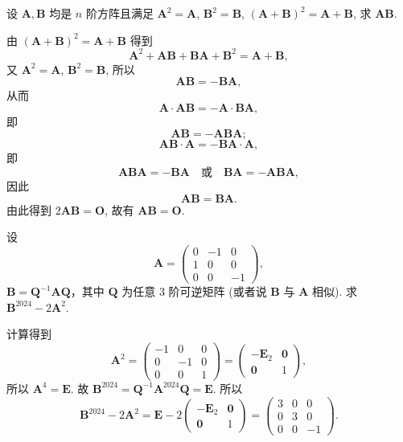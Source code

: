 \documentclass[../../main.tex]{subfiles}
\begin{document}
\begin{example}
设 $\boldsymbol{A},\boldsymbol{B}$ 均是 $n$ 阶方阵且满足 $\boldsymbol{A}^2 = \boldsymbol{A}$, $\boldsymbol{B}^2 = \boldsymbol{B}$, $(\boldsymbol{A} + \boldsymbol{B})^2 = \boldsymbol{A} + \boldsymbol{B}$, 求 $\boldsymbol{AB}$.
\end{example}
\begin{solution}
由 $(\boldsymbol{A} + \boldsymbol{B})^2 = \boldsymbol{A} + \boldsymbol{B}$ 得到
\[
\boldsymbol{A}^2 + \boldsymbol{AB} + \boldsymbol{BA} + \boldsymbol{B}^2 = \boldsymbol{A} + \boldsymbol{B},
\]
又 $\boldsymbol{A}^2 = \boldsymbol{A}$, $\boldsymbol{B}^2 = \boldsymbol{B}$, 所以
\[
\boldsymbol{AB} = -\boldsymbol{BA},
\]
从而
\[
\boldsymbol{A} \cdot \boldsymbol{AB} = -\boldsymbol{A} \cdot \boldsymbol{BA},
\]
即
\[
\boldsymbol{AB} = -\boldsymbol{ABA};
\]
\[
\boldsymbol{AB} \cdot \boldsymbol{A} = -\boldsymbol{BA} \cdot \boldsymbol{A},
\]
即
\[
\boldsymbol{ABA} = -\boldsymbol{BA} \quad \text{或} \quad \boldsymbol{BA} = -\boldsymbol{ABA},
\]
因此
\[
\boldsymbol{AB} = \boldsymbol{BA}.
\]
由此得到 $2\boldsymbol{AB} = \boldsymbol{O}$, 故有 $\boldsymbol{AB} = \boldsymbol{O}$.
\end{solution}

\begin{example}
设
\[
\boldsymbol{A} = \begin{pmatrix} 0 & -1 & 0 \\ 1 & 0 & 0 \\ 0 & 0 & -1 \end{pmatrix},
\]
\(\boldsymbol{B} = \boldsymbol{Q}^{-1}\boldsymbol{A}\boldsymbol{Q}\)，其中 \(\boldsymbol{Q}\) 为任意 3 阶可逆矩阵 (或者说 \(\boldsymbol{B}\) 与 \(\boldsymbol{A}\) 相似). 求 \(\boldsymbol{B}^{2024} - 2\boldsymbol{A}^2\).
\end{example}
\begin{solution}
计算得到
\[
\boldsymbol{A}^2 = \begin{pmatrix} -1 & 0 & 0 \\ 0 & -1 & 0 \\ 0 & 0 & 1 \end{pmatrix} = \begin{pmatrix} -\boldsymbol{E}_2 & \boldsymbol{0} \\ \boldsymbol{0} & 1 \end{pmatrix},
\]
所以 \(\boldsymbol{A}^4 = \boldsymbol{E}\). 故 \(\boldsymbol{B}^{2024} = \boldsymbol{Q}^{-1}\boldsymbol{A}^{2024}\boldsymbol{Q} = \boldsymbol{E}\). 所以
\[
\boldsymbol{B}^{2024} - 2\boldsymbol{A}^2 = \boldsymbol{E} - 2\begin{pmatrix} -\boldsymbol{E}_2 & \boldsymbol{0} \\ \boldsymbol{0} & 1 \end{pmatrix} = \begin{pmatrix} 3 & 0 & 0 \\ 0 & 3 & 0 \\ 0 & 0 & -1 \end{pmatrix}.
\]
\end{solution}
\end{document}
